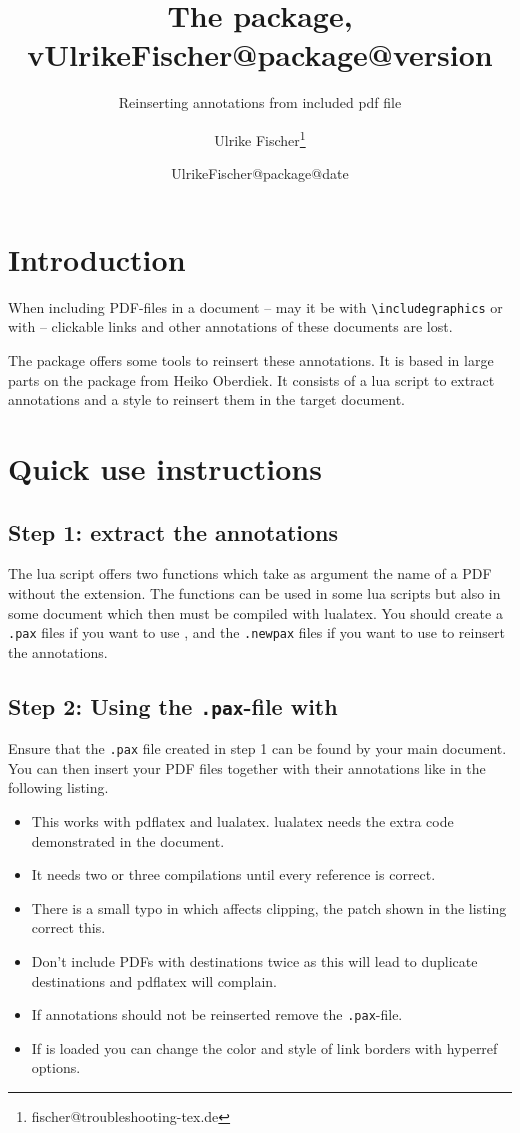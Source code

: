 \documentclass[DIV=12,parskip=half-,bibliography=totoc]{scrartcl}
\title{The \pkg{newpax} package, v\csname UlrikeFischer@package@version\endcsname}
\subtitle{Reinserting annotations from included pdf file}
\date{\csname UlrikeFischer@package@date\endcsname}
\author{Ulrike Fischer\thanks{fischer@troubleshooting-tex.de}}
\begin{document}
\maketitle

\section{Introduction}

When including PDF-files in a document -- may it be with \verb+\includegraphics+ or with \verb++ -- clickable links and other annotations of these documents are lost.

The   package offers some tools to reinsert these annotations. It is based in large parts
on the  package from Heiko Oberdiek. It consists of a lua script to extract annotations and a style to reinsert them in the target document.

\section{Quick use instructions}
\subsection{Step 1: extract the annotations}
The lua script offers two functions which take as argument the name of a PDF without the extension.
The functions can be used in some lua scripts but also in some document which then must be compiled
with lualatex. You should create a \texttt{.pax} files if you want to use , and the \texttt{.newpax} files if you want to use  to reinsert the annotations.



\subsection{Step 2: Using the \texttt{.pax}-file with }

Ensure that the \texttt{.pax} file created in step 1 can be found by your main document. You can then insert your PDF files together with their annotations like in the following listing.

\begin{itemize}
\item This works with pdflatex and lualatex. lualatex needs the extra code demonstrated in the document.
\item It needs two or three compilations until every reference is correct.
\item There is a small typo in  which affects clipping, the patch shown in the listing correct this.
\item Don't include PDFs with destinations twice as this will lead to duplicate destinations and pdflatex will complain.
\item If annotations should not be reinserted remove the \texttt{.pax}-file.
\item If  is loaded you can change the color and style of link borders with hyperref options.
\end{itemize}
\end{document}

